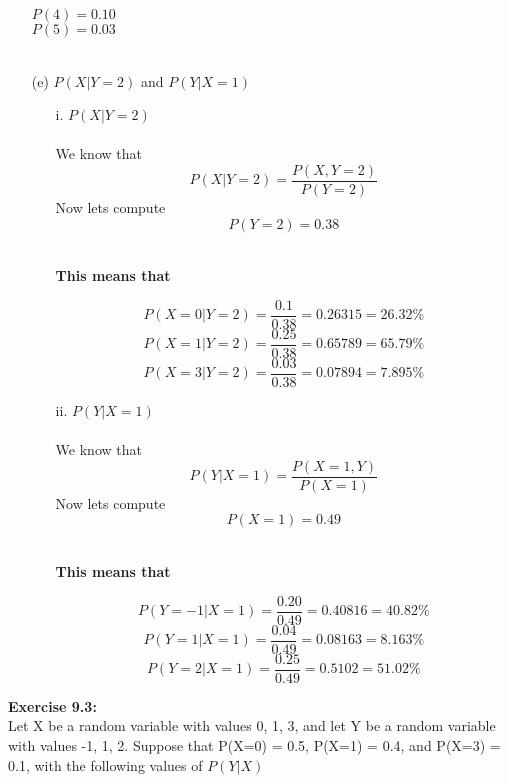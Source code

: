 \documentclass[11pt]{article}
\begin{document}
\begin{enumerate}
$P(4) = 0.10$\\
$P(5) = 0.03$\\\
\item[(e)] $P(X | Y = 2)$ and $P(Y | X = 1)$
\\
\begin{itemize}
\item[i. ]\textbf{$P(X | Y = 2)$}
\\ \\
We know that $$P(X | Y = 2) = \frac{P(X , Y = 2)}{P(Y = 2)}$$ 
Now lets compute
$$P(Y = 2) = 0.38$$ \\
\begin{center}
\textbf{This means that}
\end{center}
{\Large
$$P(X = 0 | Y = 2) = \frac{0.1}{0.38} = 0.26315 = 26.32\%$$
$$P(X = 1 | Y = 2) = \frac{0.25}{0.38} = 0.65789 = 65.79\%$$
$$P(X = 3 | Y = 2) = \frac{0.03}{0.38} = 0.07894 = 7.895\%$$
}
\item[ii. ] $P(Y | X = 1)$ \\ \\
  We know that $$P(Y | X = 1) = \frac{P(X = 1, Y)}{P(X = 1)}$$ 
Now lets compute
$$P(X = 1) = 0.49$$\\
\begin{center}
\textbf{This means that} \\
\end{center}
{\Large
$$P(Y = -1 | X = 1) = \frac{0.20}{0.49} = 0.40816 = 40.82\%$$
$$P(Y = 1 | X = 1) = \frac{0.04}{0.49} = 0.08163 = 8.163\%$$
$$P(Y = 2 | X = 1) = \frac{0.25}{0.49} = 0.5102 = 51.02\%$$
}
\end{itemize}
\end{enumerate}
\newpage
\textbf{Exercise 9.3: }\\
Let X be a random variable with values 0, 1, 3, and let Y be a random variable with values -1, 1, 2.  Suppose that P(X=0) = 0.5, P(X=1) = 0.4, and P(X=3) = 0.1, with the following values of $P(Y | X)$
\end{document}
